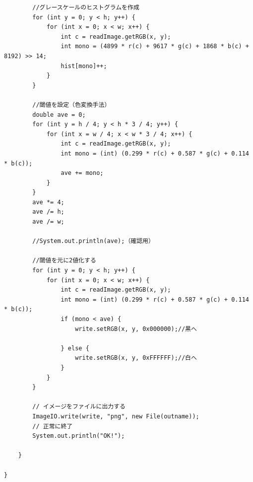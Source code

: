 \documentclass{thesis}
\begin{document}
\begin{lstlisting}
		//グレースケールのヒストグラムを作成
		for (int y = 0; y < h; y++) {
			for (int x = 0; x < w; x++) {
				int c = readImage.getRGB(x, y);
				int mono = (4899 * r(c) + 9617 * g(c) + 1868 * b(c) + 8192) >> 14;
				hist[mono]++;
			}
		}

		//閾値を設定（色変換手法）
		double ave = 0;
		for (int y = h / 4; y < h * 3 / 4; y++) {
			for (int x = w / 4; x < w * 3 / 4; x++) {
				int c = readImage.getRGB(x, y);
				int mono = (int) (0.299 * r(c) + 0.587 * g(c) + 0.114 * b(c));
				ave += mono;
			}
		}
		ave *= 4;
		ave /= h;
		ave /= w;

		//System.out.println(ave);（確認用）

		//閾値を元に2値化する
		for (int y = 0; y < h; y++) {
			for (int x = 0; x < w; x++) {
				int c = readImage.getRGB(x, y);
				int mono = (int) (0.299 * r(c) + 0.587 * g(c) + 0.114 * b(c));
				if (mono < ave) {
					write.setRGB(x, y, 0x000000);//黒へ

				} else {
					write.setRGB(x, y, 0xFFFFFF);//白へ
				}
			}
		}

		// イメージをファイルに出力する
		ImageIO.write(write, "png", new File(outname));
		// 正常に終了
		System.out.println("OK!");

	}

}

\end{lstlisting}



\newpage
\end{document}

